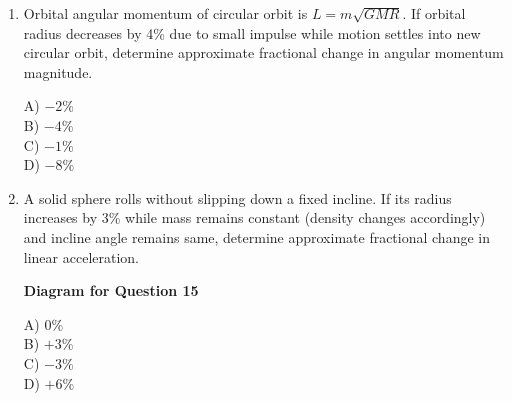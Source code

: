 \documentclass[12pt]{article}
\begin{document}
\begin{enumerate}
A) $2\%$ \\
B) $4\%$ \\
C) $6\%$ \\
D) $8\%$

\item Orbital angular momentum of circular orbit is $L=m\sqrt{GMR}$. If orbital radius decreases by 4\% due to small impulse while motion settles into new circular orbit, determine approximate fractional change in angular momentum magnitude.

A) $-2\%$ \\
B) $-4\%$ \\
C) $-1\%$ \\
D) $-8\%$

\item A solid sphere rolls without slipping down a fixed incline. If its radius increases by 3\% while mass remains constant (density changes accordingly) and incline angle remains same, determine approximate fractional change in linear acceleration.

\begin{center}
\textbf{Diagram for Question 15}
\end{center}

A) $0\%$ \\
B) $+3\%$ \\
C) $-3\%$ \\
D) $+6\%$

\end{enumerate}
\end{document}
